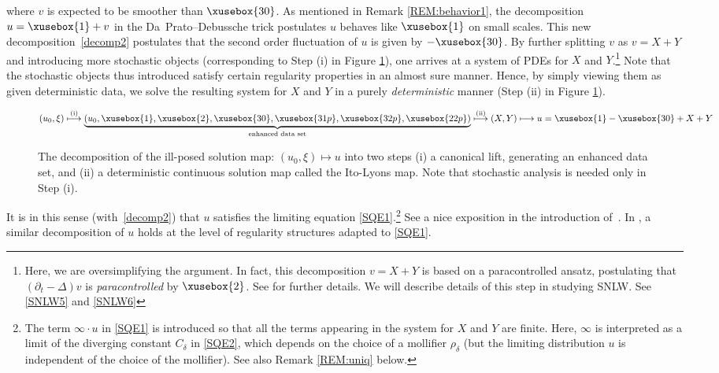 \documentclass[%
11pt,  reqno]{amsart}
\def\<#1>{\xusebox{#1}}
\newcommand{\1}{\hspace{0.2mm}\text{I}\hspace{0.2mm}}
\newcommand{\noi}{\noindent}
\newcommand{\dl}{\delta}
\newcommand{\Dl}{\Delta}
\newcommand{\dt}{\partial_t}
\numberwithin{equation}{section}
\numberwithin{theorem}{section}
\begin{document}
\noi
where $v$ is expected to be smoother than $\<30>$.
As mentioned in Remark \ref{REM:behavior1},
 the decomposition $u = \<1> + v$ in the Da~Prato--Debussche trick 
 postulates $u$ behaves like $\<1>$ on small scales.
This new  decomposition~\eqref{decomp2}
postulates that the second order fluctuation of $u$
is given by $-\<30>$.
By further splitting $v$
as $v = X + Y$
and introducing more stochastic objects (corresponding to Step (i) in Figure \ref{FIG:1}),   
one arrives at a system of PDEs
for $X$ and $Y$.\footnote{Here, we are oversimplifying the argument.
In fact, this decomposition $v = X + Y$ is based on a paracontrolled ansatz,
postulating that $(\dt - \Dl)v$ is {\it paracontrolled} by $\<2>$.
See \cite{CC, MW1} for further details.
We will describe details of this step 
in studying SNLW.
See \eqref{SNLW5} and \eqref{SNLW6}
}
Note that 
the  stochastic objects thus introduced 
satisfy certain regularity properties in an almost sure manner.
Hence, by simply viewing them  as given deterministic data,
 we solve the resulting system for $X$ and $Y$
in a purely {\it deterministic} manner (Step (ii) in Figure \ref{FIG:1}).
\begin{figure}[h]

\[ (u_0, \xi) \stackrel{\tiny \text{(i)}}{\longmapsto} \underbrace{(u_0, \<1>, \<2>, \<30>, \<31p>, \<32p>, \<22p>)}_{\text{enhanced data set}} 
\stackrel{\tiny \text{(ii)}}{\longmapsto}   (X, Y) \longmapsto  u = \<1>- \<30> + X+Y\]

\caption{The decomposition of the ill-posed solution map:
$(u_0, \xi)\mapsto u$
into two steps (i) a canonical lift, generating an enhanced data set, 
and (ii) a deterministic continuous solution map called the Ito-Lyons map.
Note that stochastic analysis is needed only in Step (i).}
 \label{FIG:1}

\end{figure}

\noi
It is in this sense (with~\eqref{decomp2})
that $u$ satisfies the limiting equation \eqref{SQE1}.\footnote{The term $\infty\cdot u$
in \eqref{SQE1}  is introduced so that all the terms
appearing in the system for $X$ and $Y$ are finite.
Here, $\infty$ is interpreted as a limit of the diverging constant $C_\dl$
in \eqref{SQE2}, which depends on the choice of a mollifier $\rho_\dl$
(but the limiting distribution $u$ is independent of the choice of the mollifier).
See also Remark \ref{REM:uniq} below.
}
See a nice exposition in the introduction of~\cite{MW1}.
In \cite{Hairer}, a similar decomposition of $u$ holds at the level of regularity structures
adapted to \eqref{SQE1}.
\end{document}
